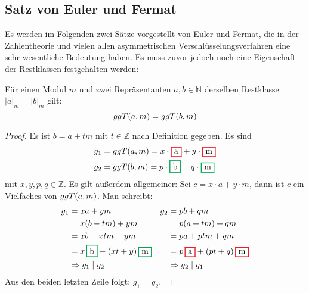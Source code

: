 \subsection{Satz von Euler und Fermat}
Es werden im Folgenden zwei Sätze vorgestellt von Euler und Fermat, die
in der Zahlentheorie und vielen allen asymmetrischen Verschlüsselungsverfahren
eine sehr wesentliche Bedeutung haben.
Es muss zuvor jedoch noch eine Eigenschaft der Restklassen festgehalten werden:

\begin{satz}
  \label{satz:restklasse-ggt}
  Für einen Modul $m$ und zwei Repräsentanten $a,b \in \mathbb{N}$ derselben
  Restklasse $\vert a \vert_m = \vert b \vert_m$ gilt:
  \begin{equation*}
    ggT(a,m) = ggT(b,m)
  \end{equation*}
\end{satz}
\begin{proof}
  Es ist $b = a + tm$ mit $t \in \mathbb{Z}$ nach Definition gegeben. Es sind
  \begin{align*}
    g_1 & = \ggt{a}{m} = x \cdot \hl{Red}{a} + y \cdot \hl{Red}{m}     \\
    g_2 & = \ggt{b}{m} = p \cdot \hl{Green}{b} + q \cdot \hl{Green}{m}
  \end{align*}
  mit $x,y,p,q \in \mathbb{Z}$. Es gilt außerdem allgemeiner: Sei $c = x \cdot a + y \cdot m$,
  dann ist $c$ ein Vielfaches von $ggT(a,m)$.
  Man schreibt:
  \begin{align*}
    g_1 & = xa + ym                                    & g_2 & = pb + qm                                \\
        & = x(b - tm) + ym                             &     & = p(a + tm) + qm                         \\
        & = xb - xtm + ym                              &     & = pa + ptm + qm                          \\
        & = x\,\hl{Green}{b} - (xt + y)\,\hl{Green}{m} &     & = p\,\hl{Red}{a} + (pt + q)\,\hl{Red}{m} \\
        & \Rightarrow g_1 \mid g_2                     &     & \Rightarrow g_2 \mid g_1
  \end{align*}
  Aus den beiden letzten Zeile folgt: $g_1 = g_2$.
\end{proof}


